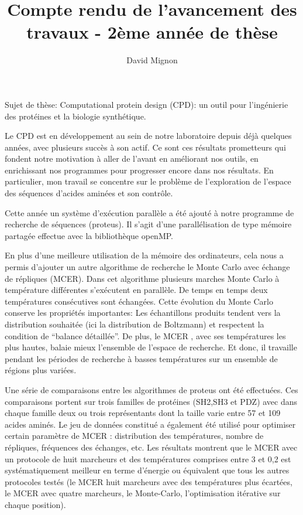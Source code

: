 \documentclass[a4paper,11pt]{article}
\title{Compte rendu de l'avancement des travaux - 2ème année de thèse}
\author{David Mignon}
\begin{document}
\maketitle


\begin{spacing}{1.0}

  Sujet de thèse:
  Computational protein design (CPD): un outil pour l'ingénierie des protéines et la biologie synthétique.
 
  Le CPD est en développement au sein de notre laboratoire depuis déjà quelques années, avec plusieurs succès à son actif.
  Ce sont ces résultats prometteurs qui fondent notre motivation à aller de l'avant en améliorant nos outils, en enrichissant 
  nos programmes pour progresser encore dans nos résultats. En particulier, mon travail se concentre sur le problème de l'exploration de l'espace des séquences d'acides aminées et son contrôle.

  Cette année un système d'exécution parallèle a été ajouté à notre programme de recherche de séquences (proteus). Il s'agit d'une parallélisation de type mémoire partagée effectue avec la bibliothèque openMP. 

  En plus d'une meilleure utilisation de la mémoire des ordinateurs, cela nous a permis d'ajouter un autre algorithme de recherche le Monte Carlo avec échange de répliques (MCER). Dans cet algorithme plusieurs marches Monte Carlo à température différentes s'exécutent en parallèle. De temps en temps deux températures consécutives sont échangées. Cette  évolution du Monte Carlo conserve les propriétés importantes: Les échantillons produits tendent vers la distribution souhaitée (ici la distribution de Boltzmann) et respectent la condition de ``balance détaillée''. De plus, le MCER , avec ses températures les plus hautes, balaie mieux l'ensemble de l'espace de recherche. Et donc, il travaille pendant les périodes de recherche à basses températures sur un ensemble de régions plus variées.      
  
  Une série de comparaisons entre les algorithmes de proteus ont été effectuées. Ces comparaisons portent sur trois familles de protéines (SH2,SH3 et PDZ) avec dans chaque famille deux ou trois représentants dont la taille varie entre 57 et 109 acides aminés. Le jeu de données constitué a également été utilisé pour optimiser certain paramètre de MCER : distribution des températures, nombre de répliques, fréquences des échanges, etc. Les résultats montrent que le MCER avec un protocole de huit marcheurs et des températures comprises entre 3 et 0,2 est systématiquement meilleur en terme d'énergie ou équivalent que tous les autres protocoles testés (le MCER huit marcheurs avec des températures plus écartées, le MCER avec quatre marcheurs, le Monte-Carlo, l'optimisation itérative sur chaque position). 


\end{spacing}
\end{document}
